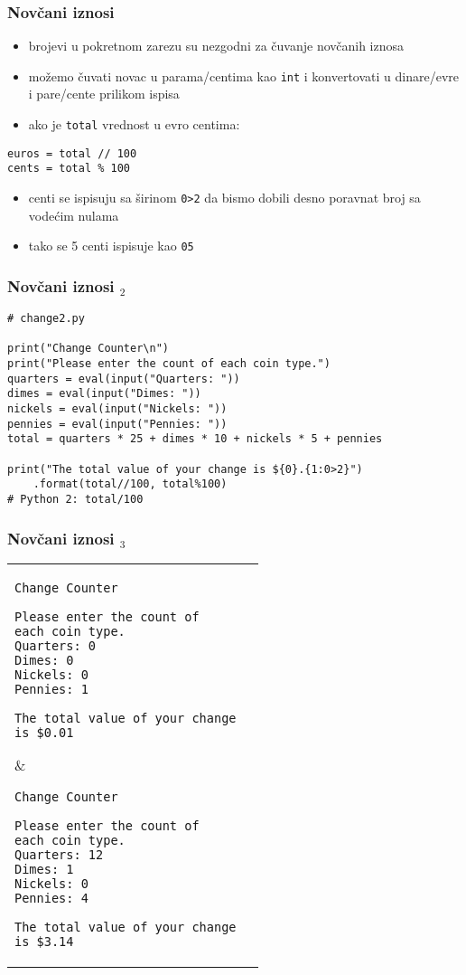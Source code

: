 \documentclass[utf8,compress,aspectratio=169]{beamer}
\begin{document}
\begin{frame}[fragile]
  \frametitle{Novčani iznosi}
  \begin{itemize}
    \item brojevi u pokretnom zarezu su nezgodni za čuvanje novčanih iznosa
    \item možemo čuvati novac u parama/centima kao \texttt{int} i konvertovati u dinare/evre i pare/cente prilikom ispisa
    \item ako je \texttt{total} vrednost u evro centima:
  \end{itemize}
\begin{verbatim}
euros = total // 100
cents = total % 100
\end{verbatim}
  \begin{itemize}
    \item centi se ispisuju sa širinom \texttt{0>2} da bismo dobili desno poravnat broj sa vodećim nulama
    \item tako se 5 centi ispisuje kao \texttt{05}
  \end{itemize}
\end{frame}

\begin{frame}[fragile]
  \frametitle{Novčani iznosi $_2$}
\begin{verbatim}
# change2.py

print("Change Counter\n")
print("Please enter the count of each coin type.")
quarters = eval(input("Quarters: "))
dimes = eval(input("Dimes: "))
nickels = eval(input("Nickels: "))
pennies = eval(input("Pennies: "))
total = quarters * 25 + dimes * 10 + nickels * 5 + pennies

print("The total value of your change is ${0}.{1:0>2}")
    .format(total//100, total%100)
# Python 2: total/100
\end{verbatim}
\end{frame}

\begin{frame}[fragile,shrink=20]
  \frametitle{Novčani iznosi $_3$}
\begin{center}
\begin{tabular}{p{6cm}|p{6cm}}
\begin{verbatim}
Change Counter

Please enter the count of
each coin type.
Quarters: 0
Dimes: 0
Nickels: 0
Pennies: 1

The total value of your change
is $0.01
\end{verbatim}
&
\begin{verbatim}
Change Counter

Please enter the count of
each coin type.
Quarters: 12
Dimes: 1
Nickels: 0
Pennies: 4

The total value of your change
is $3.14
\end{verbatim}
\end{tabular}
\end{center}
\end{frame}
\end{document}
